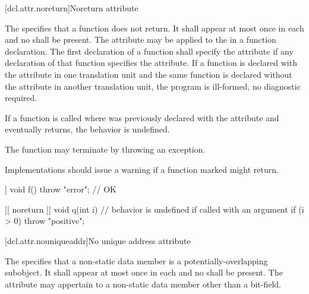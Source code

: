 [dcl.attr.noreturn]{Noreturn attribute}%

\pnum
The   specifies that a function does not return. It
shall appear at most once in each  and no
 shall be present. The attribute may be applied to the
 in a function declaration. The first declaration of a function shall
specify the  attribute if any declaration of that function specifies the
 attribute. If a function is declared with the  attribute in one
translation unit and the same function is declared without the  attribute in another
translation unit, the program is ill-formed, no diagnostic required.

\pnum
If a function  is called where  was previously declared with the 
attribute and  eventually returns, the behavior is undefined.
\begin{note}
The function may
terminate by throwing an exception.
\end{note}
\begin{note}
Implementations should issue a
warning if a function marked \tcode{[[noreturn]]} might return.
\end{note}

\pnum
\begin{example}
\begin{codeblock}
[[ noreturn ]] void f() {
  throw "error";                // OK
}

[[ noreturn ]] void q(int i) {  // behavior is undefined if called with an argument 
  if (i > 0)
    throw "positive";
}
\end{codeblock}
\end{example}

[dcl.attr.nouniqueaddr]{No unique address attribute}%

\pnum
The  
specifies that a non-static data member
is a potentially-overlapping subobject.
It shall appear at most once in each 
and no  shall be present.
The attribute may appertain to a non-static data member
other than a bit-field.

